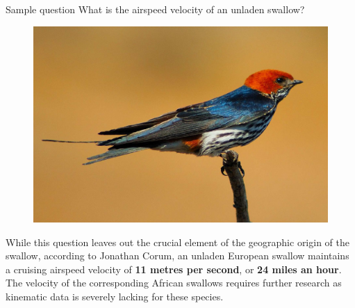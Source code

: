 \documentclass[11pt]{article}
\begin{document}

\maketitle %

\thispagestyle{empty} %

\newpage


\begin{question}[20\%]{Sample question}
  What is the airspeed velocity of an unladen swallow?

  \begin{figure}[H]
    \centering
    \includegraphics[width=0.4\linewidth]{./assets/swallow.jpg}
  \end{figure}

  \begin{answer}
    While this question leaves out the crucial element of the geographic origin of the swallow, according to Jonathan Corum, an unladen European swallow maintains a cruising airspeed velocity of \textbf{11 metres per second}, or \textbf{24 miles an hour}. The velocity of the corresponding African swallows requires further research as kinematic data is severely lacking for these species.
  \end{answer}

\end{question}
\end{document}
